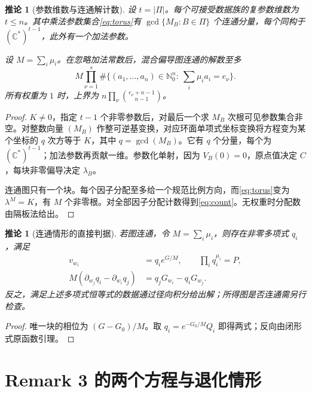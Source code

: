 \documentclass[UTF8,11pt,a4paper,fontset=fandol]{ctexart}
\newtheorem{corollary}[theorem]{推论}
\theoremstyle{definition}\newtheorem{definition}[theorem]{定义}
\theoremstyle{remark}\newtheorem{remark}[theorem]{注}
\newcommand{\C}{\mathbb C}\newcommand{\N}{\mathbb N}
\begin{document}
\begin{corollary}[参数维数与连通解计数]\label{cor:count}
设 $t=|\Pi|$。每个可接受数据族的复参数维数为 $t\le n$。其中乘法参数集合\eqref{eq:torus}有 $\gcd\{M_B:B\in\Pi\}$ 个连通分量，每个同构于 $(\C^*)^{t-1}$，此外有一个加法参数。

设 $M=\sum_i\mu_i$。在忽略加法常数后，混合偏导图连通的解数至多
\begin{equation}\label{eq:count}
M\prod_{\nu=1}^s
\#\{(a_1,\ldots,a_n)\in\N_0^n:\ \sum_i\mu_i a_i=e_\nu\}.
\end{equation}
所有权重为 $1$ 时，上界为 $n\prod_\nu {e_\nu+n-1\choose n-1}$。
\end{corollary}
\begin{proof}
$K\ne0$，指定 $t-1$ 个非零参数后，对最后一个求 $M_B$ 次根可见参数集合非空。对整数向量 $(M_B)$ 作整可逆基变换，对应环面单项式坐标变换将方程变为某个坐标的 $q$ 次方等于 $K$，其中 $q=\gcd(M_B)$。它有 $q$ 个分量，每个为 $(\C^*)^{t-1}$；加法参数再贡献一维。参数化单射，因为 $V_B(0)=0$，原点值决定 $C$，每块非零偏导决定 $\lambda_B$。

连通图只有一个块。每个因子分配至多给一个规范比例方向，而\eqref{eq:torus}变为 $\lambda^M=K$，有 $M$ 个非零根。对全部因子分配计数得到\eqref{eq:count}。无权重时分配数由隔板法给出。
\end{proof}

\begin{corollary}[连通情形的直接判据]\label{cor:connected}
若图连通，令 $M=\sum_i\mu_i$，则存在非零多项式 $q_i$，满足
\begin{align}
v_{w_i}&=q_i e^{G/M},\qquad \prod_iq_i^{\mu_i}=P,\label{eq:connected}\\
M(\partial_{w_j}q_i-\partial_{w_i}q_j)&=q_jG_{w_i}-q_iG_{w_j}.\label{eq:polytest}
\end{align}
反之，满足上述多项式恒等式的数据通过径向积分给出解；所得图是否连通需另行检查。
\end{corollary}
\begin{proof}
唯一块的相位为 $(G-G_0)/M$。取 $q_i=e^{-G_0/M}Q_i$ 即得两式；反向由闭形式原函数引理。
\end{proof}

\section{Remark 3 的两个方程与退化情形}
\end{document}
